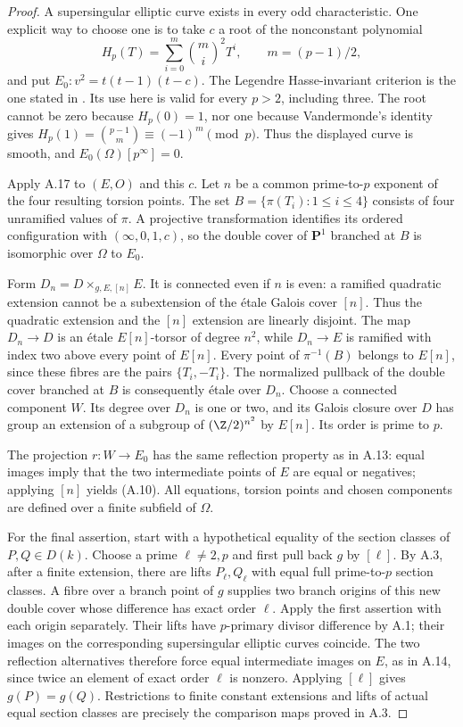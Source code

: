 \begin{proof}
A supersingular elliptic curve exists in every odd
characteristic. One explicit way to choose one is to take
$c$ a root of the nonconstant polynomial
\[
 H_p(T)=\sum_{i=0}^{m}\binom mi^2T^i,
 \qquad m=(p-1)/2,
\]
and put $E_0:v^2=t(t-1)(t-c)$. The Legendre
Hasse-invariant criterion is the one stated in
\citet[\S1, equations (1.2)--(1.3)]{A_Finotti2009}.
Its use here is valid for every $p>2$, including three.
The root cannot be zero because $H_p(0)=1$, nor one
because Vandermonde's identity gives
$H_p(1)=\binom{p-1}{m}\equiv(-1)^m\pmod p$.
Thus the displayed curve is smooth, and
$E_0(\Omega)[p^\infty]=0$.

Apply A.17 to $(E,O)$ and this $c$. Let $n$ be a common
prime-to-$p$ exponent of the four resulting torsion points.
The set $B=\{\pi(T_i):1\le i\le4\}$ consists of four
unramified values of $\pi$. A projective transformation
identifies its ordered configuration with
$(\infty,0,1,c)$, so the double cover of $\mathbf P^1$
branched at $B$ is isomorphic over $\Omega$ to $E_0$.

Form $D_n=D\times_{g,E,[n]}E$. It is connected even if
$n$ is even: a ramified quadratic extension cannot be a
subextension of the \'etale Galois cover $[n]$. Thus the
quadratic extension and the $[n]$ extension are linearly
disjoint. The map $D_n\to D$ is an \'etale $E[n]$-torsor
of degree $n^2$, while $D_n\to E$ is ramified with index
two above every point of $E[n]$. Every point of
$\pi^{-1}(B)$ belongs to $E[n]$, since these fibres are
the pairs $\{T_i,-T_i\}$. The normalized pullback of the
double cover branched at $B$ is consequently \'etale over
$D_n$. Choose a connected component $W$. Its degree over
$D_n$ is one or two, and its Galois closure over $D$ has
group an extension of a subgroup of $(\Z/2)^{n^2}$ by
$E[n]$. Its order is prime to $p$.

The projection $r:W\to E_0$ has the same reflection property
as in A.13: equal images imply that the two intermediate
points of $E$ are equal or negatives; applying $[n]$ yields
(A.10). All equations, torsion points and chosen components
are defined over a finite subfield of $\Omega$.

For the final assertion, start with a hypothetical equality
of the section classes of $P,Q\in D(k)$. Choose a prime
$\ell\ne2,p$ and first pull back $g$ by $[\ell]$. By A.3,
after a finite extension, there are lifts $P_\ell,Q_\ell$
with equal full prime-to-$p$ section classes. A fibre over
a branch point of $g$ supplies two branch origins of this
new double cover whose difference has exact order $\ell$.
Apply the first assertion with each origin separately.
Their lifts have $p$-primary divisor difference by A.1;
their images on the corresponding supersingular elliptic
curves coincide. The two reflection alternatives therefore
force equal intermediate images on $E$, as in A.14,
since twice an element of exact order $\ell$ is nonzero.
Applying $[\ell]$ gives $g(P)=g(Q)$. Restrictions to finite
constant extensions and lifts of actual equal section
classes are precisely the comparison maps proved in A.3.
\end{proof}

